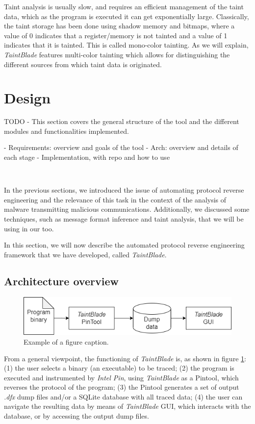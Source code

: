 \documentclass[conference]{IEEEtran}
\begin{document}
Taint analysis is usually slow, and requires an efficient management of the
taint data, which as the program is executed it can get exponentially large.
Classically, the taint storage has been done using shadow memory and bitmaps,
where a value of 0 indicates that a register/memory is not tainted and a value
of 1 indicates that it is tainted. This is called mono-color tainting. As we 
will explain, \textit{TaintBlade} features multi-color tainting which allows
for distinguishing the different sources from which taint data is originated.

\section{Design}
TODO - This section covers the general structure of the tool and the different
modules and functionalities implemented.

- Requirements: overview and goals of the tool
- Arch: overview and details of each stage
- Implementation, with repo and how to use

\

In the previous sections, we introduced the issue of automating protocol
reverse engineering and the relevance of this task in the context of the
analysis of malware transmitting malicious communications. Additionally, we
discussed some techniques, such as message format inference and taint analysis,
that we will be using in our too.

In this section, we will now describe the automated protocol reverse
engineering framework that we have developed, called \textit{TaintBlade}.

\subsection{Architecture overview}

\begin{figure}[htbp]
    \centerline{\includegraphics[width=0.9\columnwidth]{images/generalarch.drawio.png}}
    \caption{Example of a figure caption.}
    \label{fig_3_generalarch}
\end{figure}

From a general viewpoint, the functioning of \textit{TaintBlade} is, as shown
in figure \ref{fig_3_generalarch}: (1) the user selects a binary (an
executable) to be traced; (2) the program is executed and instrumented by
\textit{Intel Pin}, using \textit{TaintBlade} as a Pintool, which reverses the
protocol of the program; (3) the Pintool generates a set of output
\textit{.dfx} dump files and/or a SQLite database with all traced data; (4) the
user can navigate the resulting data by means of \textit{TaintBlade} GUI, which
interacts with the database, or by accessing the output dump files.
\end{document}
